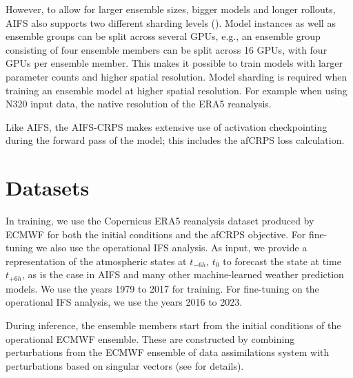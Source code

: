 \documentclass{article}
\begin{document}
However, to allow for larger ensemble sizes, bigger models and longer rollouts, AIFS also supports two different sharding levels (\cite{lang2024aifs}). Model instances as well as ensemble groups can be split across several GPUs, e.g., an ensemble group consisting of four ensemble members can be split across 16 GPUs, with four GPUs per ensemble member. This makes it possible to train models with larger parameter counts and higher spatial resolution. Model sharding is required when training an ensemble model at higher spatial resolution. For example when using N320 input data, the native resolution of the ERA5 reanalysis.

Like AIFS, the AIFS-CRPS makes extensive use of activation checkpointing \citep{chen2016training} during the forward pass of the model; this includes the afCRPS loss calculation.

\section{Datasets}
In training, we use the Copernicus ERA5 reanalysis dataset produced by ECMWF \citep{hersbach2020era5} for both the initial conditions and the afCRPS objective. For fine-tuning we also use the operational IFS analysis. As input, we provide a representation of the atmospheric states at $t_{-6h}$, $t_0$ to forecast the state at time $t_{+6h}$, as is the case in AIFS and many other machine-learned weather prediction models. We use the years 1979 to 2017 for training. For fine-tuning on the operational IFS analysis, we use the years 2016 to 2023.

During inference, the ensemble members start from the initial conditions of the operational ECMWF ensemble. These are constructed by combining perturbations from the ECMWF ensemble of data assimilations system with perturbations based on singular vectors (see \cite{lang2021more} for details).
\end{document}
